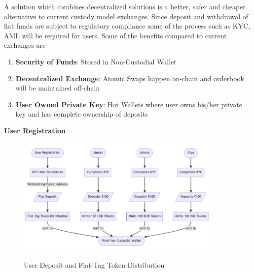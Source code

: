 \documentclass[10pt]{article}
\begin{document}
A solution which combines decentralized solutions is a better, safer and cheaper alternative to current custody model exchanges. Since deposit and withdrawal of fiat funds are subject to regulatory compliance some of the process such as KYC, AML will be required for users. Some of the benefits compared to current exchanges are
\begin{enumerate}[leftmargin=+0.2in]
\item \textbf{Security of Funds}: Stored in Non-Custodial Wallet
\item \textbf{Decentralized Exchange}: Atomic Swaps happen on-chain and orderbook will be maintained off-chain
\item \textbf{User Owned Private Key}: Hot Wallets where user owns his/her private key and has complete ownership of deposits
\end{enumerate}

\textbf{User Registration}\\

\begin{figure}[H]
\begin{center}
\includegraphics[width=10cm]{user-deposit}\\
\caption{User Deposit and Fiat-Tag Token Distribution}
\end{center}
\end{figure}

\end{document}
